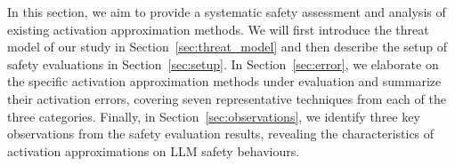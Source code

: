 

In this section, we aim to provide a systematic safety assessment and analysis of existing activation approximation methods. We will first introduce the threat model of our study in Section~\ref{sec:threat_model} and then describe the setup of safety evaluations in Section~\ref{sec:setup}. In Section~\ref{sec:error}, we elaborate on the specific activation approximation methods under evaluation and summarize their activation errors, covering seven representative techniques from each of the three categories. Finally, in Section~\ref{sec:observations}, we identify three key observations from the safety evaluation results, revealing the characteristics of activation approximations on LLM safety behaviours.

